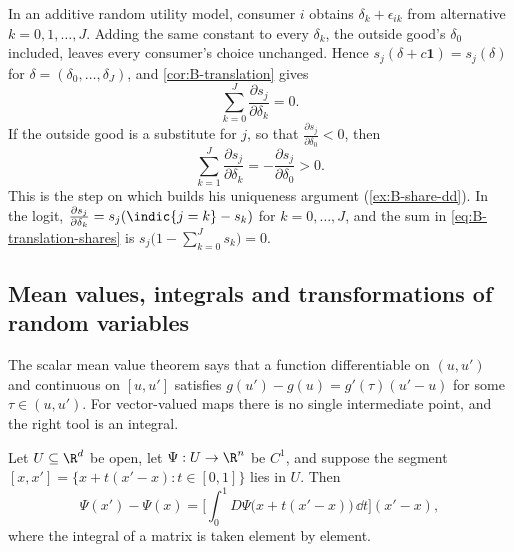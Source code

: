 \begin{example}\label{ex:B-translation-shares}
In an additive random utility model, consumer $i$ obtains $\delta_k + \epsilon_{ik}$ from alternative
$k = 0, 1, \dots, J$. Adding the same constant to every $\delta_k$, the outside good's $\delta_0$ included, leaves
every consumer's choice unchanged. Hence $s_j(\delta + c\mathbf{1}) = s_j(\delta)$ for $\delta = (\delta_0, \dots, \delta_J)$,
and \cref{cor:B-translation} gives
\begin{equation}\label{eq:B-translation-shares}
\sum_{k = 0}^{J}\frac{\partial s_j}{\partial \delta_k} = 0 .
\end{equation}
If the outside good is a substitute for $j$, so that $\frac{\partial s_j}{\partial \delta_0} < 0$, then
\begin{equation*}
\sum_{k = 1}^{J}\frac{\partial s_j}{\partial \delta_k} = -\frac{\partial s_j}{\partial \delta_0} > 0 .
\end{equation*}
This is the step on which \citet[p.~261]{Berry1994} builds his uniqueness argument (\cref{ex:B-share-dd}). In the
logit, $\frac{\partial s_j}{\partial \delta_k} = s_j(\indic\{j = k\} - s_k)$ for $k = 0, \dots, J$, and the sum in
\eqref{eq:B-translation-shares} is $s_j\big(1 - \sum_{k = 0}^{J}s_k\big) = 0$.
\end{example}

\subsection{Mean values, integrals and transformations of random variables}\label{sec:B-calculus}

The scalar mean value theorem says that a function differentiable on $(u, u')$ and continuous on $[u, u']$
satisfies $g(u') - g(u) = g'(\tau)(u' - u)$ for some $\tau \in (u, u')$. For vector-valued maps there is no single
intermediate point, and the right tool is an integral.

\begin{proposition}\label{prop:B-mvt-integral}
Let $U \subseteq \R^d$ be open, let $\Psi : U \to \R^n$ be $C^1$, and suppose the segment
$[x, x'] = \{x + t(x' - x) : t \in [0, 1]\}$ lies in $U$. Then
\begin{equation}\label{eq:B-mvt-integral}
\Psi(x') - \Psi(x) = \Big[\int_0^1 D\Psi\big(x + t(x' - x)\big)\,\dd t\Big](x' - x) ,
\end{equation}
where the integral of a matrix is taken element by element.
\end{proposition}

